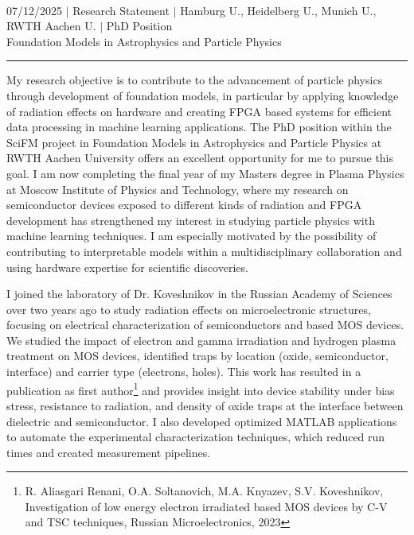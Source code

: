 \documentclass[a4paper,12pt]{article}
\begin{document}
\begin{center}
    {\Huge \scshape {\fontsize{25}{30}\selectfont{Reza}} {\fontsize{25}{30}}} \\ \vspace{3pt}
    {\small {07/12/2025}} $|$
    {\small {Research Statement}} $|$
    {\small {Hamburg U., Heidelberg U., Munich U., RWTH Aachen U.}} $|$
    {\small {PhD Position}} \\
    {\small {Foundation Models in Astrophysics and Particle Physics}}
    \vspace{-10pt}
\end{center}
\vspace{-10pt}
\noindent\rule{\textwidth}{0.5pt}

My research objective is to contribute to the advancement of particle physics through development of foundation models, in particular by applying knowledge of radiation effects on hardware and creating FPGA based systems for efficient data processing in machine learning applications. The PhD position within the SciFM project in Foundation Models in Astrophysics and Particle Physics at RWTH Aachen University offers an excellent opportunity for me to pursue this goal. I am now completing the final year of my Masters degree in Plasma Physics at Moscow Institute of Physics and Technology, where my research on semiconductor devices exposed to different kinds of radiation and FPGA development has strengthened my interest in studying particle physics with machine learning techniques. I am especially motivated by the possibility of contributing to interpretable models within a multidisciplinary collaboration and using hardware expertise for scientific discoveries.

\vspace{5pt}

I joined the laboratory of Dr. Koveshnikov in the Russian Academy of Sciences over two years ago to study radiation effects on microelectronic structures, focusing on electrical characterization of semiconductors and  based MOS devices. We studied the impact of electron and gamma irradiation and hydrogen plasma treatment on MOS devices, identified traps by location (oxide, semiconductor, interface) and carrier type (electrons, holes). This work has resulted in a publication as first author\footnote{R. Aliasgari Renani, O.A. Soltanovich, M.A. Knyazev, S.V. Koveshnikov, Investigation of low energy electron irradiated  based MOS devices by C-V and TSC techniques, Russian Microelectronics, 2023} and provides insight into device stability under bias stress, resistance to radiation, and density of oxide traps at the interface between dielectric and semiconductor. I also developed optimized MATLAB applications to automate the experimental characterization techniques, which reduced run times and created measurement pipelines.
\end{document}
